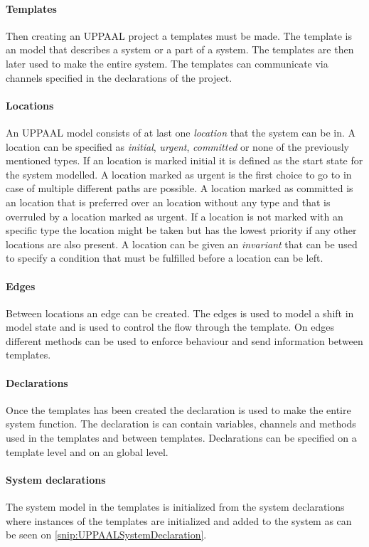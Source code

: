 \paragraph{Templates}
Then creating an UPPAAL project a templates must be made.
The template is an model that describes a system or a part of a system.  
The templates are then later used to make the entire system. 
The templates can communicate via channels specified in the declarations of the project.

\paragraph{Locations}
An UPPAAL model consists of at last one \textit{location} that the system can be in. 
A location can be specified as \textit{initial}, \textit{urgent}, \textit{committed} or none of the previously mentioned types. 
If an location is marked initial it is defined as the start state for the system modelled. 
A location marked as urgent is the first choice to go to in case of multiple different paths are possible. 
A location marked as committed is an location that is preferred over an location without any type and that is overruled by a location marked as urgent. 
If a location is not marked with an specific type the location might be taken but has the lowest priority if any other locations are also present. 
A location can be given an \textit{invariant} that can be used to specify a condition that must be fulfilled before a location can be left. 

\paragraph{Edges}
Between locations an edge can be created. 
The edges is used to model a shift in model state and is used to control the flow through the template. 
On edges different methods can be used to enforce behaviour and send information between templates. 

\paragraph{Declarations}
Once the templates has been created the declaration is used to make the entire system function. 
The declaration is can contain variables, channels and methods used in the templates and between templates. 
Declarations can be specified on a template level and on an global level. 

\paragraph{System declarations}
The system model in the templates is initialized from the system declarations where instances of the templates are initialized and added to the system as can be seen on \autoref{snip:UPPAALSystemDeclaration}. 


